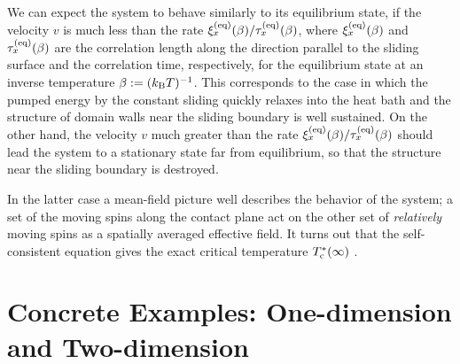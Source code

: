 We can expect the system to behave similarly to its equilibrium state, if the velocity $v$ is much less than the rate $\xi^{(\rm eq)}_{x}(\beta)/\tau^{(\rm eq)}_{x}(\beta)$, where $\xi^{(\rm eq)}_{x}(\beta)$ and $\tau^{(\rm eq)}_{x}(\beta)$ are the correlation length along the direction parallel to the sliding surface and the correlation time, respectively, for the equilibrium state at an inverse temperature $\beta:=(k_{\rm B}T)^{-1}$. This corresponds to the case in which the pumped energy by the constant sliding quickly relaxes into the heat bath and the structure of domain walls near the sliding boundary is well sustained. On the other hand, the velocity $v$ much greater than the rate $\xi^{(\rm eq)}_{x}(\beta)/\tau^{(\rm eq)}_{x}(\beta)$ should lead the system to a stationary state far from equilibrium, so that the structure near the sliding boundary is destroyed. 

In the latter case a mean-field picture \cite{Hucht2009b} well describes the behavior of the system; a set of the moving spins along the contact plane act on the other set of \textit{relatively} moving spins as a spatially averaged effective field. It turns out that the self-consistent equation gives the exact critical temperature $T^{*}_{\rm c}(\infty)$ \cite{Hucht2009b}.

\section{Concrete Examples: One-dimension and Two-dimension}

